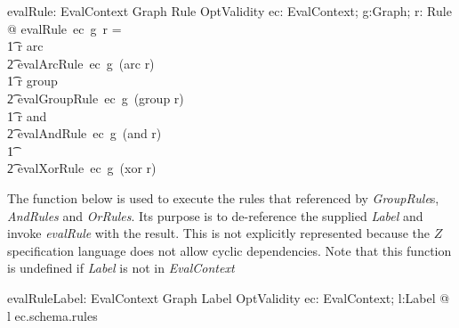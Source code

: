 \documentclass[fuzz]{llncs}
\def\entryFor{\cdot}
\def\zc{\textit}
\begin{document}
\begin{gendef}
   evalRule: EvalContext \fun Graph \fun Rule \fun OptValidity
\where
   \forall ec: EvalContext; g:Graph; r: Rule @ evalRule~ec~g~r = \\
\t1 \IF r \in \ran arc \\
\t2 \THEN evalArcRule~ec~g~(arc \entryFor r) \\
\t1 \ELSE \IF r \in \ran group \\
\t2 \THEN evalGroupRule~ec~g~(group \entryFor r) \\
\t1 \ELSE \IF r \in \ran and \\
\t2 \THEN evalAndRule~ec~g~(and \entryFor r) \\
\t1 \ELSE \\
\t2 evalXorRule~ec~g~(xor \entryFor r)
\end{gendef}
The function below is used to execute the rules that referenced by \zc{GroupRule}s,
\zc{AndRules} and \zc{OrRules}. Its purpose is to de-reference the supplied \zc{Label} and
invoke \zc{evalRule} with the result.  This is not explicitly represented because
the $Z$ specification language does not allow cyclic dependencies. Note that this function
is undefined if \zc{Label} is not in \zc{EvalContext}
\begin{gendef}
   evalRuleLabel: EvalContext \fun Graph \fun Label \fun OptValidity
\where
   \forall ec: EvalContext; l:Label @ l \in \dom ec.schema.rules
\end{gendef}
\end{document}
